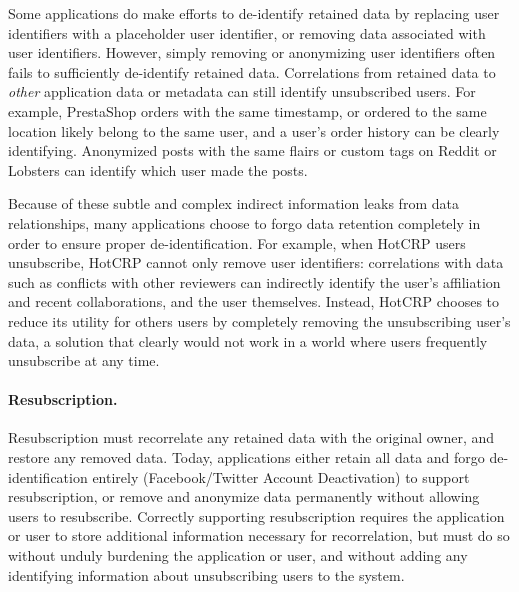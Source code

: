 Some applications do make efforts to de-identify retained data by replacing user identifiers with a
placeholder user identifier, or removing data associated with user identifiers.  However, simply
removing or anonymizing user identifiers often fails to sufficiently de-identify retained data.
Correlations from retained data to \emph{other} application data or metadata can still identify
unsubscribed users. For example, PrestaShop orders with the same timestamp, or ordered to the same
location likely belong to the same user, and a user's order history can be clearly identifying.
Anonymized posts with the same flairs or custom tags on Reddit or Lobsters can identify which user
made the posts.

Because of these subtle and complex indirect information leaks from data relationships, many
applications choose to forgo data retention completely in order to ensure proper de-identification.
For example, when HotCRP users unsubscribe, 
HotCRP cannot only remove user identifiers: correlations with data such as
conflicts with other reviewers can indirectly identify the user's affiliation and recent
collaborations, and the user themselves. Instead, HotCRP chooses to reduce its
utility for others users by completely removing the unsubscribing user's data, a solution that clearly would not work in a world where
users frequently unsubscribe at any time.

\paragraph{Resubscription.}
Resubscription must recorrelate any retained data with the original owner, and restore any removed
data. Today, applications either retain all data and forgo de-identification entirely
(Facebook/Twitter Account Deactivation) to support resubscription, or remove and anonymize data
permanently without allowing users to resubscribe. Correctly supporting resubscription requires the
application or user to store additional information necessary for recorrelation, but must do so
without unduly burdening the application or user, and without adding any identifying information
about unsubscribing users to the system.

%


